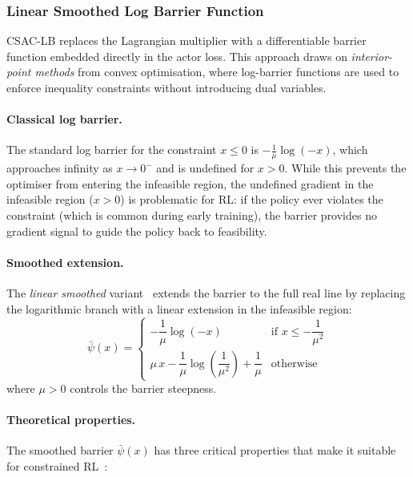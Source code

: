 \subsubsection{Linear Smoothed Log Barrier Function}

CSAC-LB replaces the Lagrangian multiplier with a differentiable barrier
function embedded directly in the actor loss.  This approach draws on
\emph{interior-point methods} from convex optimisation, where log-barrier
functions are used to enforce inequality constraints without introducing
dual variables.

\paragraph{Classical log barrier.}
The standard log barrier for the constraint $x \leq 0$ is
$-\frac{1}{\mu}\log(-x)$, which approaches infinity as $x \to 0^-$ and
is undefined for $x > 0$.  While this prevents the optimiser from entering
the infeasible region, the undefined gradient in the infeasible region
($x > 0$) is problematic for RL: if the policy ever violates the constraint
(which is common during early training), the barrier provides no gradient
signal to guide the policy back to feasibility.

\paragraph{Smoothed extension.}
The \emph{linear smoothed} variant~\cite{zhang2024csaclb} extends the barrier
to the full real line by replacing the logarithmic branch with a linear
extension in the infeasible region:
\begin{equation}
  \bar{\psi}(x) =
  \begin{cases}
    -\dfrac{1}{\mu} \log(-x) & \text{if } x \leq -\dfrac{1}{\mu^2}
    \\[8pt]
    \mu\, x - \dfrac{1}{\mu}\log\!\left(\dfrac{1}{\mu^2}\right)
      + \dfrac{1}{\mu}
    & \text{otherwise}
  \end{cases}
  \label{eq:smoothed-barrier}
\end{equation}
where $\mu > 0$ controls the barrier steepness.

\paragraph{Theoretical properties.}
The smoothed barrier $\bar{\psi}(x)$ has three critical properties that make it
suitable for constrained RL~\cite{zhang2024csaclb}:

